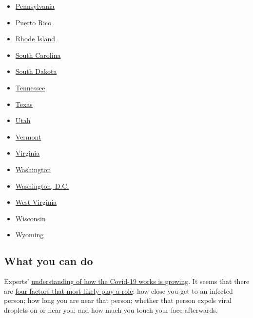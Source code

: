 \begin{itemize}
\item
  \href{https://www.nytimes.com/interactive/2020/us/pennsylvania-coronavirus-cases.html}{Pennsylvania}
\item
  \href{https://www.nytimes.com/interactive/2020/us/puerto-rico-coronavirus-cases.html}{Puerto
  Rico}
\item
  \href{https://www.nytimes.com/interactive/2020/us/rhode-island-coronavirus-cases.html}{Rhode
  Island}
\item
  \href{https://www.nytimes.com/interactive/2020/us/south-carolina-coronavirus-cases.html}{South
  Carolina}
\item
  \href{https://www.nytimes.com/interactive/2020/us/south-dakota-coronavirus-cases.html}{South
  Dakota}
\item
  \href{https://www.nytimes.com/interactive/2020/us/tennessee-coronavirus-cases.html}{Tennessee}
\item
  \href{https://www.nytimes.com/interactive/2020/us/texas-coronavirus-cases.html}{Texas}
\item
  \href{https://www.nytimes.com/interactive/2020/us/utah-coronavirus-cases.html}{Utah}
\item
  \href{https://www.nytimes.com/interactive/2020/us/vermont-coronavirus-cases.html}{Vermont}
\item
  \href{https://www.nytimes.com/interactive/2020/us/virginia-coronavirus-cases.html}{Virginia}
\item
  \href{https://www.nytimes.com/interactive/2020/us/washington-coronavirus-cases.html}{Washington}
\item
  \href{https://www.nytimes.com/interactive/2020/us/washington-dc-coronavirus-cases.html}{Washington,
  D.C.}
\item
  \href{https://www.nytimes.com/interactive/2020/us/west-virginia-coronavirus-cases.html}{West
  Virginia}
\item
  \href{https://www.nytimes.com/interactive/2020/us/wisconsin-coronavirus-cases.html}{Wisconsin}
\item
  \href{https://www.nytimes.com/interactive/2020/us/wyoming-coronavirus-cases.html}{Wyoming}
\end{itemize}

\hypertarget{what-you-can-do}{%
\subsection{What you can do}\label{what-you-can-do}}

Experts'
\href{https://www.nytimes.com/2020/06/02/health/coronavirus-profile-covid.html}{understanding
of how the Covid-19 works is growing}. It seems that there are
\href{https://www.nytimes.com/article/coronavirus-how-it-spreads.html}{four
factors that most likely play a role}: how close you get to an infected
person; how long you are near that person; whether that person expels
viral droplets on or near you; and how much you touch your face
afterwards.

